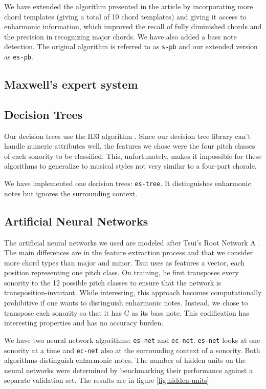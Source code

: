 \documentclass{article}
\begin{document}
We have extended the algorithm presented in the article by
incorporating more chord templates (giving a total of 10 chord
templates) and giving it access to enharmonic information, which
improved the recall of fully diminished chords and the precision in
recognizing major chords. We have also added a bass note
detection. The original algorithm is referred to as \texttt{s-pb} and
our extended version as \texttt{es-pb}.

\subsection{Maxwell's expert system}
\label{sec:maxwell}


\subsection{Decision Trees}
\label{sec:tree}

Our decision trees use the ID3 algorithm
\cite{mitchell:machine}. Since our decision tree library can't handle
numeric attributes well, the features we chose were the four pitch
classes of each sonority to be classified. This, unfortunately,
makes it impossible for these algorithms to generalize to musical
styles not very similar to a four-part chorale.

We have implemented one decision trees: \texttt{es-tree}. It
distinguishes enharmonic notes but ignores the surrounding context.

\subsection{Artificial Neural Networks}
\label{sec:neural-net}


The artificial neural networks we used are modeled after Tsui's Root
Network A \cite{tsui:harmonic}. The main differences are in the
feature extraction process and that we consider more chord types than
major and minor. Tsui \cite{tsui:harmonic} uses as features a vector,
each position representing one pitch class. On training, he first
transposes every sonority to the 12 possible pitch classes to ensure
that the network is transposition-invariant. While interesting, this
approach becomes computationally prohibitive if one wants to
distinguish enharmonic notes. Instead, we chose to transpose each
sonority so that it has C as its bass note. This codification has
interesting properties and has no accuracy burden.

We have two neural network algorithms: \texttt{es-net} and
\texttt{ec-net}.  \texttt{es-net} looks at one sonority at a time and
\texttt{ec-net} also at the surrounding context of a sonority. Both
algorithms distinguish enharmonic notes. The number of hidden units on
the neural networks were determined by benchmarking their performance
against a separate validation set. The results are in figure
\ref{fig:hidden-units}
\end{document}
